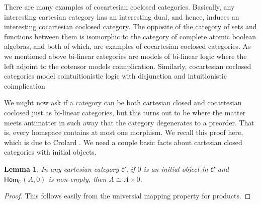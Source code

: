 \documentclass{lmcs}
\newtheorem{lemma}[theorem]{Lemma}
\newcommand{\cat}[1]{\mathcal{#1}}
\newcommand{\Hom}[3]{\mathsf{Hom}_{\cat{#1}}(#2,#3)}
\begin{document}
There are many examples of cocartesian coclosed categories.
Basically, any interesting cartesian category has an interesting dual,
and hence, induces an interesting cocartesian coclosed category.
The opposite of the category of sets and functions between them is
isomorphic to the category of complete atomic boolean algebras, and
both of which, are examples of cocartesian coclosed categories.  As
we mentioned above bi-linear categories \cite{Cockett:1997a} are
models of bi-linear logic where the left adjoint to the cotensor
models coimplication.  Similarly, cocartesian coclosed categories
model cointuitionistic logic with disjunction and intuitionistic
coimplication

We might now ask if a category can be both cartesian closed and
cocartesian coclosed just as bi-linear categories, but this turns out
to be where the matter meets antimatter in such away that the category
degenerates to a preorder.  That is, every homspace contains at most
one morphism.  We recall this proof here, which is due to Crolard
\cite{Crolard:2001}. We need a couple basic facts about cartesian
closed categories with initial objects.
\begin{lemma}
  \label{lemma:iso-prod-initial}
  In any cartesian category $\cat{C}$, if $0$ is an initial object in
  $\cat{C}$ and $\Hom{C}{A}{0}$ is non-empty, then $A \cong A \times 0$.
\end{lemma}
\begin{proof}
  This follows easily from the universial mapping property for products.
\end{proof}
\end{document}
